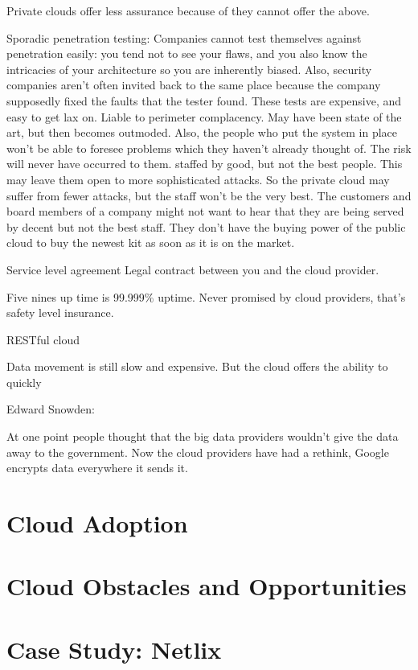 \documentclass[11pt]{article}
\begin{document}
Private clouds offer less assurance because of they cannot offer the above.

Sporadic penetration testing: Companies cannot test themselves against penetration easily: you tend not to see your flaws, and you also know the intricacies of your architecture so you are inherently biased. Also, security companies aren’t often invited back to the same place because the company supposedly fixed the faults that the tester found. These tests are expensive, and easy to get lax on.
Liable to perimeter complacency. May have been state of the art, but then becomes outmoded. Also, the people who put the system in place won’t be able to foresee problems which they haven’t already thought of. The risk will never have occurred to them.
staffed by good, but not the best people. This may leave them open to more sophisticated attacks. So the private cloud may suffer from fewer attacks, but the staff won’t be the very best. The customers and board members of a company might not want to hear that they are being served by decent but not the best staff.
They don’t have the buying power of the public cloud to buy the newest kit as soon as it is on the market.

Service level agreement
Legal contract between you and the cloud provider.

Five nines up time is 99.999\% uptime. Never promised by cloud providers, that’s safety level insurance.

RESTful cloud

Data movement is still slow and expensive. But the cloud offers the ability to quickly 

Edward Snowden:

At one point people thought that the big data providers wouldn’t give the data away to the government. Now the cloud providers have had a rethink, Google encrypts data everywhere it sends it.


\section{Cloud Adoption}

\section{Cloud Obstacles and Opportunities}

\section{Case Study: Netlix}
\end{document}
